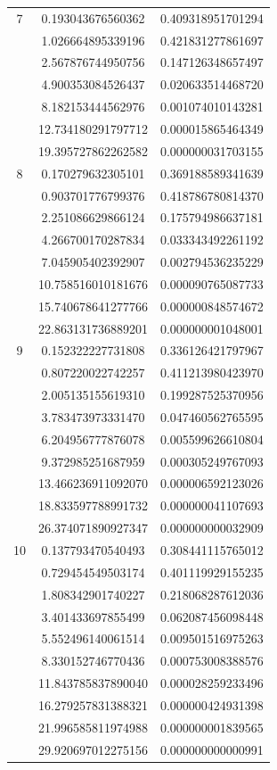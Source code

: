\documentclass[a4paper, 11pt]{article}
\begin{document}
\begin{table}[H]
	\centering
	\begin{tabular}{c | c c}
		7 & 0.193043676560362 &  0.409318951701294\\
		& 1.026664895339196 &  0.421831277861697\\
		& 2.567876744950756 &  0.147126348657497\\
		& 4.900353084526437 &  0.020633514468720\\
		& 8.182153444562976 &  0.001074010143281\\
		& 12.734180291797712 &  0.000015865464349\\
		& 19.395727862262582 &  0.000000031703155\\
		\hline
		8 & 0.170279632305101 &  0.369188589341639\\
		& 0.903701776799376 &  0.418786780814370\\
		& 2.251086629866124 &  0.175794986637181\\
		& 4.266700170287834 &  0.033343492261192\\
		& 7.045905402392907 &  0.002794536235229\\
		& 10.758516010181676 &  0.000090765087733\\
		& 15.740678641277766 &  0.000000848574672\\
		& 22.863131736889201 &  0.000000001048001\\
		\hline
		9 & 0.152322227731808 &  0.336126421797967 \\
		& 0.807220022742257 &  0.411213980423970\\
		& 2.005135155619310 &  0.199287525370956\\
		& 3.783473973331470 &  0.047460562765595\\
		& 6.204956777876078 &  0.005599626610804\\
		& 9.372985251687959 &  0.000305249767093\\
		& 13.466236911092070 &  0.000006592123026\\
		& 18.833597788991732 &  0.000000041107693\\
		& 26.374071890927347 &  0.000000000032909\\
		\hline
		10 & 0.137793470540493 &  0.308441115765012\\
		& 0.729454549503174 &  0.401119929155235\\
		& 1.808342901740227 &  0.218068287612036\\
		& 3.401433697855499 &  0.062087456098448\\
		& 5.552496140061514 &  0.009501516975263\\
		& 8.330152746770436 &  0.000753008388576\\
		& 11.843785837890040 &  0.000028259233496\\
		& 16.279257831388321 &  0.000000424931398\\
		& 21.996585811974988 &  0.000000001839565\\
		& 29.920697012275156 &  0.000000000000991\\
	\end{tabular}
\end{table}
\end{document}
